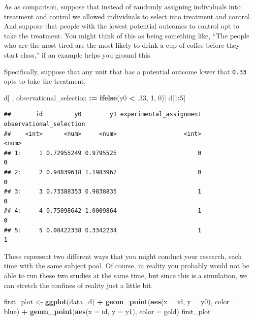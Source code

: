 \documentclass[
]{article}
\newenvironment{Shaded}{\begin{snugshade}}{\end{snugshade}}
\newcommand{\AttributeTok}[1]{\textcolor[rgb]{0.13,0.29,0.53}{#1}}
\newcommand{\DecValTok}[1]{\textcolor[rgb]{0.00,0.00,0.81}{#1}}
\newcommand{\FunctionTok}[1]{\textcolor[rgb]{0.13,0.29,0.53}{\textbf{#1}}}
\newcommand{\NormalTok}[1]{#1}
\newcommand{\OtherTok}[1]{\textcolor[rgb]{0.56,0.35,0.01}{#1}}
\newcommand{\SpecialCharTok}[1]{\textcolor[rgb]{0.81,0.36,0.00}{\textbf{#1}}}
\theoremstyle{definition}
\theoremstyle{definition}
\theoremstyle{definition}
\theoremstyle{definition}
\theoremstyle{remark}
\begin{document}
As as comparison, suppose that instead of randomly assigning individuals into treatment and control we allowed individuals to select into treatment and control. And suppose that people with the lowest potential outcomes to control opt to take the treatment. You might think of this as being something like, ``The people who are the most tired are the most likely to drink a cup of coffee before they start class,'' if an example helps you ground this.

Specifically, suppose that any unit that has a potential outcome lower that \texttt{0.33} opts to take the treatment.

\begin{Shaded}
\begin{Highlighting}[]
\NormalTok{d[ , observational\_selection }\SpecialCharTok{:=} \FunctionTok{ifelse}\NormalTok{(y0 }\SpecialCharTok{\textless{}}\NormalTok{ .}\DecValTok{33}\NormalTok{, }\DecValTok{1}\NormalTok{, }\DecValTok{0}\NormalTok{)]}
\NormalTok{d[}\DecValTok{1}\SpecialCharTok{:}\DecValTok{5}\NormalTok{]}
\end{Highlighting}
\end{Shaded}

\begin{verbatim}
##       id         y0        y1 experimental_assignment observational_selection
##    <int>      <num>     <num>                   <int>                   <num>
## 1:     1 0.72955249 0.9795525                       0                       0
## 2:     2 0.94839618 1.1983962                       0                       0
## 3:     3 0.73388353 0.9838835                       1                       0
## 4:     4 0.75098642 1.0009864                       1                       0
## 5:     5 0.08422338 0.3342234                       1                       1
\end{verbatim}

These represent two different ways that you might conduct your research, each time with the same subject pool. Of course, in reality you probably would not be able to run these two studies at the same time, but since this is a simulation, we can stretch the confines of reality just a little bit.

\begin{Shaded}
\begin{Highlighting}[]
\NormalTok{first\_plot }\OtherTok{\textless{}{-}} \FunctionTok{ggplot}\NormalTok{(}\AttributeTok{data=}\NormalTok{d) }\SpecialCharTok{+} 
  \FunctionTok{geom\_point}\NormalTok{(}\FunctionTok{aes}\NormalTok{(}\AttributeTok{x =}\NormalTok{ id, }\AttributeTok{y =}\NormalTok{ y0), }\AttributeTok{color =}\NormalTok{ blue) }\SpecialCharTok{+} 
  \FunctionTok{geom\_point}\NormalTok{(}\FunctionTok{aes}\NormalTok{(}\AttributeTok{x =}\NormalTok{ id, }\AttributeTok{y =}\NormalTok{ y1), }\AttributeTok{color =}\NormalTok{ gold)}
\NormalTok{first\_plot  }
\end{Highlighting}
\end{Shaded}
\end{document}
